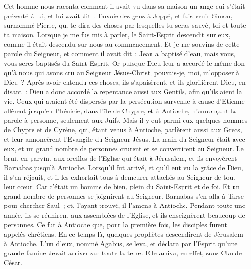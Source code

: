 \begin{multicols}{2}
Cet homme nous raconta comment il avait vu dans sa maison un ange qui s'était présenté à lui, et lui avait dit~: Envoie des gens à Joppé, et fais venir Simon, surnommé Pierre,
qui te dira des choses par lesquelles tu seras sauvé, toi et toute ta maison.
Lorsque je me fus mis à parler, le Saint-Esprit descendit sur eux, comme il était descendu sur nous au commencement.
Et je me souvins de cette parole du Seigneur, et comment il avait dit~: Jean a baptisé d'eau, mais vous, vous serez baptisés du Saint-Esprit.
Or puisque Dieu leur a accordé le même don qu'à nous qui avons cru au Seigneur Jésus-Christ, pouvais-je, moi, m'opposer à Dieu~?
Après avoir entendu ces choses, ils s'apaisèrent, et ils glorifièrent Dieu, en disant~: Dieu a donc accordé la repentance aussi aux Gentils, afin qu'ils aient la vie.
Ceux qui avaient été dispersés par la persécution survenue à cause d'Etienne allèrent jusqu'en Phénicie, dans l'île de Chypre, et à Antioche, n'annonçant la parole à personne, seulement aux Juifs.
Mais il y eut parmi eux quelques hommes de Chypre et de Cyrène, qui, étant venus à Antioche, parlèrent aussi aux Grecs, et leur annoncèrent l'Evangile du Seigneur Jésus.
La main du Seigneur était avec eux, et un grand nombre de personnes crurent et se convertirent au Seigneur.
Le bruit en parvint aux oreilles de l'Eglise qui était à Jérusalem, et ils envoyèrent Barnabas jusqu'à Antioche.
Lorsqu'il fut arrivé, et qu'il eut vu la grâce de Dieu, il s'en réjouit, et il les exhortait tous à demeurer attachés au Seigneur de tout leur cœur.
Car c'était un homme de bien, plein du Saint-Esprit et de foi. Et un grand nombre de personnes se joignirent au Seigneur.
Barnabas s'en alla à Tarse pour chercher Saul~;
et, l'ayant trouvé, il l'amena à Antioche. Pendant toute une année, ils se réunirent aux assemblées de l'Eglise, et ils enseignèrent beaucoup de personnes. Ce fut à Antioche que, pour la première fois, les disciples furent appelés chrétiens.
En ce temps-là, quelques prophètes descendirent de Jérusalem à Antioche.
L'un d'eux, nommé Agabus, se leva, et déclara par l'Esprit qu'une grande famine devait arriver sur toute la terre. Elle arriva, en effet, sous Claude César.

\end{multicols}
